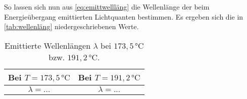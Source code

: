 So lassen sich nun aus \eqref{eq:emittwellläng} die Wellenlänge der beim Energieübergang emittierten Lichtquanten bestimmen.
Es ergeben sich die in \autoref{tab:wellenläng} niedergeschriebenen Werte.

\begin{table}[H]
    \centering
    \caption{Emittierte Wellenlängen $\lambda$ bei $173,5 \,\unit{\celsius}$ bzw. $191,2 \,\unit{\celsius}$.}
    \label{tab:messung2}
    \begin{tabular}{S[table-format = 2.3] S[table-format = 2.3]}
      \toprule
      {Bei $T = 173,5 \,\unit{\celsius}$} & {Bei $T = 191,2 \,\unit{\celsius}$}\\
      \midrule
                  {$\lambda = ...$}           &           {$\lambda = ...$}           \\
      \bottomrule
    \end{tabular}
\end{table}